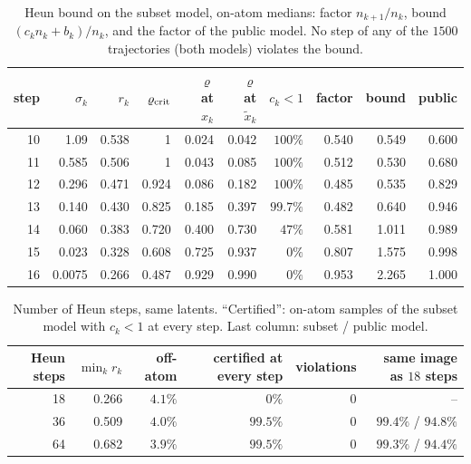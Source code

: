 \documentclass{article} %
\theoremstyle{plain}
\theoremstyle{definition}
\theoremstyle{remark}
\begin{document}
\begin{table}[h]
\centering\small
\begin{tabular}{@{}rrrrrrrrrr@{}}
\toprule
step & $\sigma_k$ & $r_k$ & $\varrho_{\rm crit}$ & $\varrho$ at $x_k$ & $\varrho$ at $\tilde x_k$ & $c_k<1$ & factor & bound & public\\
\midrule
10 & 1.09 & 0.538 & 1 & 0.024 & 0.042 & $100\%$ & 0.540 & 0.549 & 0.600\\
11 & 0.585 & 0.506 & 1 & 0.043 & 0.085 & $100\%$ & 0.512 & 0.530 & 0.680\\
12 & 0.296 & 0.471 & 0.924 & 0.086 & 0.182 & $100\%$ & 0.485 & 0.535 & 0.829\\
13 & 0.140 & 0.430 & 0.825 & 0.185 & 0.397 & $99.7\%$ & 0.482 & 0.640 & 0.946\\
14 & 0.060 & 0.383 & 0.720 & 0.400 & 0.730 & $47\%$ & 0.581 & 1.011 & 0.989\\
15 & 0.023 & 0.328 & 0.608 & 0.725 & 0.937 & $0\%$ & 0.807 & 1.575 & 0.998\\
16 & 0.0075 & 0.266 & 0.487 & 0.929 & 0.990 & $0\%$ & 0.953 & 2.265 & 1.000\\
\bottomrule
\end{tabular}
\caption{Heun bound on the subset model, on-atom medians: factor $n_{k+1}/n_k$, bound
$(c_kn_k+b_k)/n_k$, and the factor of the public model. No step of any of the $1500$ trajectories
(both models) violates the bound.}
\label{tab:edm-heun}
\end{table}

\begin{table}[h]
\centering\small
\begin{tabular}{@{}rrrrrr@{}}
\toprule
Heun steps & $\min_kr_k$ & off-atom & certified at every step & violations & same image as $18$ steps\\
\midrule
18 & 0.266 & $4.1\%$ & $0\%$ & 0 & --\\
36 & 0.509 & $4.0\%$ & $99.5\%$ & 0 & $99.4\%$ / $94.8\%$\\
64 & 0.682 & $3.9\%$ & $99.5\%$ & 0 & $99.3\%$ / $94.4\%$\\
\bottomrule
\end{tabular}
\caption{Number of Heun steps, same latents. ``Certified'': on-atom samples of the subset model
with $c_k<1$ at every step. Last column: subset / public model.}
\label{tab:edm-steps}
\end{table}
\end{document}
